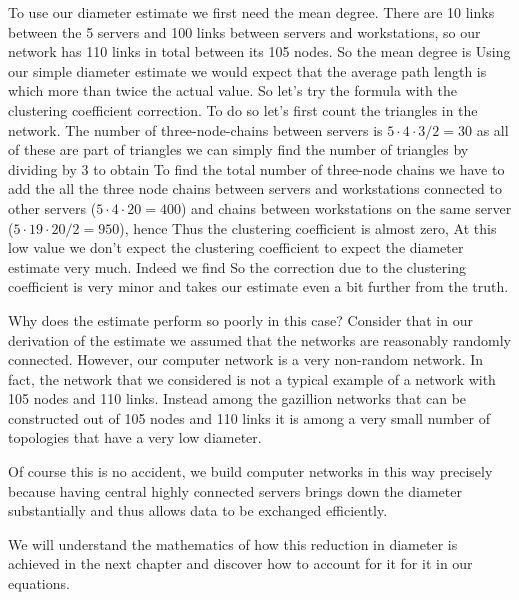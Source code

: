 To use our diameter estimate we first need the mean degree. There are 10 links between the 5 servers and 100 links between servers and workstations, so our network has 110 links in total between its 105 nodes. So the mean degree is 
Using our simple diameter estimate we would expect that the average path length is 
which more than twice the actual value. So let's try the formula with the clustering coefficient correction. To do so let's first count the triangles in the network. The number of three-node-chains between servers is $5\cdot 4 \cdot 3 / 2 = 30$ as all of these are part of triangles we can simply find the number of triangles by dividing by 3 to obtain 
To find the total number of three-node chains we have to add the all the three node chains between servers and workstations connected to other servers ($5\cdot 4 \cdot 20=400$) and chains between workstations on the same server ($5 \cdot 19 \cdot 20/2=950$), hence 
Thus the clustering coefficient is almost zero, 
At this low value we don't expect the clustering coefficient to expect the diameter estimate very much. Indeed we find 
So the correction due to the clustering coefficient is very minor and takes our estimate even a bit further from the truth. 

Why does the estimate perform so poorly in this case? Consider that in our derivation of the estimate we assumed that the networks are reasonably randomly connected. However, our computer network is a very non-random network. In fact, the network that we considered is not a typical example of a network with 105 nodes and 110 links. Instead among the gazillion networks that can be constructed out of 105 nodes and 110 links it is among a very small number of topologies that have a very low diameter. 

Of course this is no accident, we build computer networks in this way precisely because having central highly connected servers brings down the diameter substantially and thus allows data to be exchanged efficiently. 

We will understand the mathematics of how this reduction in diameter is achieved in the next chapter and discover how to account for it  for it in our equations. 
